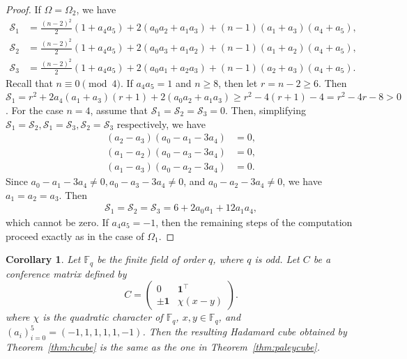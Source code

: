 \documentclass[11pt,oneside]{amsart}
\newtheorem{corollary}[theorem]{Corollary}
\begin{document}
{\begin{proof}
    If $\Omega=\Omega_2$,  we have 
    \begin{align*}
    \mathscr S_1&=
\frac{(n-2)^2}{2}(1+a_4 a_5) + 2 (a_0  a_2  + a_1  a_3)  +(n- 1) (a_1 + a_3)(  a_4 + a_5),\\
    \mathscr S_2&=\frac{(n-2)^2}{2}(1+a_4 a_5) + 2 (a_0  a_3 + a_1  a_2)  +(n- 1) (a_1 + a_2)(  a_4 + a_5),\\
    \mathscr S_3&=\frac{(n-2)^2}{2}(1+a_4  a_5) + 2 (a_0  a_1  +  a_2  a_3)  +(n- 1) (a_2 + a_3)(  a_4 + a_5).
    \end{align*}
Recall that $n\equiv 0 \pmod 4$. If $a_4 a_5=1$ and $n\geq 8$, then let $r=n-2\geq 6$. Then $\mathscr S_1=r^2+ 2a_4 (a_1+a_3)(r+1) + 2(a_0 a_2+a_1 a_3)\geq r^2 -4(r+1)-4=r^2-4r-8>0$. 
For the case $n=4$, assume that $\mathscr S_1=\mathscr S_2=\mathscr S_3=0$. Then, simplifying $\mathscr S_1=\mathscr S_2,\mathscr S_1=\mathscr S_3,\mathscr S_2=\mathscr S_3$ respectively, we have
\begin{align*}
    (a_2-a_3)(a_0-a_1-3a_4)&=0,\\
    (a_1-a_2)(a_0-a_3-3a_4)&=0,\\
    (a_1-a_3)(a_0-a_2-3a_4)&=0.
    \end{align*}
    Since $a_0-a_1-3a_4\neq0,a_0-a_3-3a_4\neq0$, and  $a_0-a_2-3a_4\neq0$, we have $a_1=a_2=a_3$. 
    Then 
    \begin{align*}
    \mathscr S_1=\mathscr S_2=\mathscr S_3=6+ 2 a_0  a_1   +12a_1a_4,
    \end{align*}
    which cannot be zero. 
If $a_4 a_5=-1$, then the remaining steps of the computation proceed exactly as in the case of $\Omega_1$. 
\end{proof}
\begin{corollary}
    Let $\mathbb{F}_q$ be the finite field of order $q$, where $q$ is odd. 
    Let $C$ be a conference matrix defined by 
    \[
C =
\begin{pmatrix}
0 & \mathbf{1}^\top \\
\pm \mathbf{1} & \chi(x-y)
\end{pmatrix}.
\]
   where $\chi$ is the quadratic character of $\mathbb{F}_q$, $x,y\in\mathbb{F}_q$, and $(a_i)_{i=0}^5=(-1,1,1,1,1,-1)$. Then the resulting Hadamard cube obtained by Theorem~\ref{thm:hcube} is the same as the one in Theorem~\ref{thm:paleycube}.
\end{corollary}


}
\end{document}
